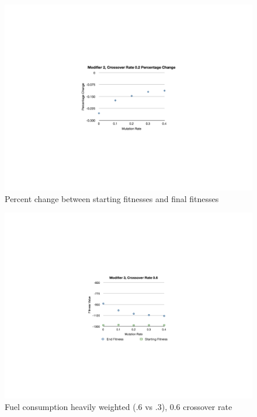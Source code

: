 \begin{figure}[h!]	
	\hspace*{-2in}\includegraphics[width=10in]{images/FitMut02Percent.png}\hspace*{0in}\vspace*{-2in}
	\caption{Percent change between starting fitnesses and final fitnesses}
	\label{Figure 4}
\end{figure}

\begin{figure}[h!]
	\hspace*{-2in}\includegraphics[width=10in]{images/FitMut03.png}\hspace*{0in}\vspace*{-2in}
	\caption{Fuel consumption heavily weighted (.6 vs .3), 0.6 crossover rate}
	\label{Figure 5}
\end{figure}


